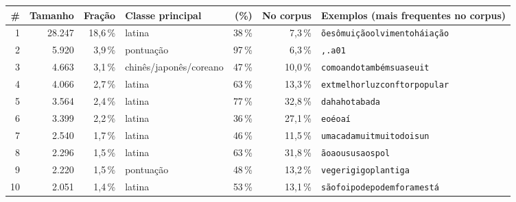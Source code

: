 \footnotesize
\setlength{\tabcolsep}{4pt}
\begin{tabularx}{\linewidth}{rrrlrrX}
\toprule
\# & Tamanho & Fração & Classe principal & (\%) & No corpus & Exemplos (mais frequentes no corpus) \\
\midrule
1 & 28.247 & 18,6\,\% & latina & 38\,\% & 7,3\,\% & \texttt{ões}\enspace \texttt{ôm}\enspace \texttt{uição}\enspace \texttt{olvimento}\enspace \texttt{\textvisiblespace{}há}\enspace \texttt{iação} \\
2 & 5.920 & 3,9\,\% & pontuação & 97\,\% & 6,3\,\% & \texttt{,{}}\enspace \texttt{.}\enspace \texttt{\textvisiblespace{}a}\enspace \texttt{\textvisiblespace{}}\enspace \texttt{0}\enspace \texttt{1} \\
3 & 4.663 & 3,1\,\% & chinês/japonês/coreano & 47\,\% & 10,0\,\% & \texttt{\textvisiblespace{}como}\enspace \texttt{ando}\enspace \texttt{\textvisiblespace{}também}\enspace \texttt{\textvisiblespace{}sua}\enspace \texttt{\textvisiblespace{}seu}\enspace \texttt{it} \\
4 & 4.066 & 2,7\,\% & latina & 63\,\% & 13,3\,\% & \texttt{\textvisiblespace{}ext}\enspace \texttt{\textvisiblespace{}melhor}\enspace \texttt{\textvisiblespace{}luz}\enspace \texttt{\textvisiblespace{}conf}\enspace \texttt{\textvisiblespace{}tor}\enspace \texttt{\textvisiblespace{}popular} \\
5 & 3.564 & 2,4\,\% & latina & 77\,\% & 32,8\,\% & \texttt{\textvisiblespace{}da}\enspace \texttt{ha}\enspace \texttt{ho}\enspace \texttt{ta}\enspace \texttt{\textvisiblespace{}ba}\enspace \texttt{da} \\
6 & 3.399 & 2,2\,\% & latina & 36\,\% & 27,1\,\% & \texttt{\textvisiblespace{}e}\enspace \texttt{\textvisiblespace{}o}\enspace \texttt{\textvisiblespace{}é}\enspace \texttt{o}\enspace \texttt{a}\enspace \texttt{í} \\
7 & 2.540 & 1,7\,\% & latina & 46\,\% & 11,5\,\% & \texttt{\textvisiblespace{}uma}\enspace \texttt{\textvisiblespace{}cada}\enspace \texttt{\textvisiblespace{}muit}\enspace \texttt{\textvisiblespace{}muito}\enspace \texttt{\textvisiblespace{}dois}\enspace \texttt{un} \\
8 & 2.296 & 1,5\,\% & latina & 63\,\% & 31,8\,\% & \texttt{ão}\enspace \texttt{\textvisiblespace{}ao}\enspace \texttt{us}\enspace \texttt{\textvisiblespace{}us}\enspace \texttt{\textvisiblespace{}aos}\enspace \texttt{\textvisiblespace{}pol} \\
9 & 2.220 & 1,5\,\% & pontuação & 48\,\% & 13,2\,\% & \texttt{ve}\enspace \texttt{\textvisiblespace{}ger}\enspace \texttt{ig}\enspace \texttt{igo}\enspace \texttt{\textvisiblespace{}plant}\enspace \texttt{iga} \\
10 & 2.051 & 1,4\,\% & latina & 53\,\% & 13,1\,\% & \texttt{\textvisiblespace{}são}\enspace \texttt{\textvisiblespace{}foi}\enspace \texttt{\textvisiblespace{}pode}\enspace \texttt{\textvisiblespace{}podem}\enspace \texttt{\textvisiblespace{}foram}\enspace \texttt{\textvisiblespace{}está} \\
\bottomrule
\end{tabularx}

\par{}
